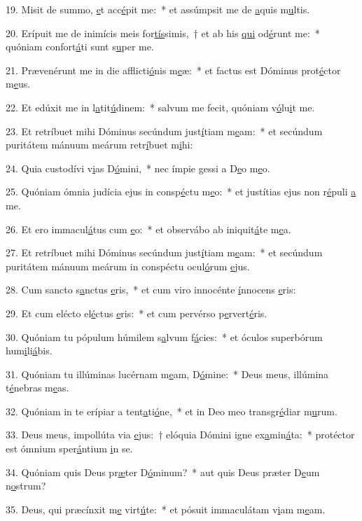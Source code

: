 19. Misit de summo, \uline{e}t acc\uline{é}pit me:~* et assúmpsit me de \uline{a}quis m\uline{u}ltis.\par 
20. Erípuit me de inimícis meis for\uline{tís}simis,~† et ab his \uline{qui} od\uline{é}runt me:~* quóniam confort\uline{á}ti sunt s\uline{u}per me.\par 
21. Prævenérunt me in die afflicti\uline{ó}nis m\uline{e}æ:~* et factus est Dóminus prot\uline{é}ctor m\uline{e}us.\par 
22. Et edúxit me in l\uline{a}tit\uline{ú}dinem:~* salvum me fecit, quóniam v\uline{ó}lu\uline{i}t me.\par 
23. Et retríbuet mihi Dóminus secúndum just\uline{í}tiam m\uline{e}am:~* et secúndum puritátem mánuum meárum retr\uline{í}buet m\uline{i}hi:\par 
24. Quia custodívi v\uline{i}as D\uline{ó}mini,~* nec ímpie gessi a D\uline{e}o m\uline{e}o.\par 
25. Quóniam ómnia judícia ejus in consp\uline{é}ctu m\uline{e}o:~* et justítias ejus non r\uline{é}puli \uline{a} me.\par 
26. Et ero immacul\uline{á}tus cum \uline{e}o:~* et observábo ab iniquit\uline{á}te m\uline{e}a.\par 
27. Et retríbuet mihi Dóminus secúndum just\uline{í}tiam m\uline{e}am:~* et secúndum puritátem mánuum meárum in conspéctu ocul\uline{ó}rum \uline{e}jus.\par 
28. Cum sancto s\uline{a}nctus \uline{e}ris,~* et cum viro innocénte \uline{í}nnocens \uline{e}ris:\par 
29. Et cum elécto el\uline{é}ctus \uline{e}ris:~* et cum pervérso p\uline{e}rvert\uline{é}ris.\par 
30. Quóniam tu pópulum húmilem s\uline{a}lvum f\uline{á}cies:~* et óculos superbórum hum\uline{i}li\uline{á}bis.\par 
31. Quóniam tu illúminas lucérnam m\uline{e}am, D\uline{ó}mine:~* Deus meus, illúmina t\uline{é}nebras m\uline{e}as.\par 
32. Quóniam in te erípiar a tent\uline{a}ti\uline{ó}ne,~* et in Deo meo transgr\uline{é}diar m\uline{u}rum.\par 
33. Deus meus, impollúta via \uline{e}jus:~† elóquia Dómini igne ex\uline{a}min\uline{á}ta:~* protéctor est ómnium sper\uline{á}ntium \uline{i}n se.\par 
34. Quóniam quis Deus pr\uline{æ}ter D\uline{ó}minum?~* aut quis Deus præter D\uline{e}um n\uline{o}strum?\par 
35. Deus, qui præcínxit m\uline{e} virt\uline{ú}te:~* et pósuit immaculátam v\uline{i}am m\uline{e}am.\par 
